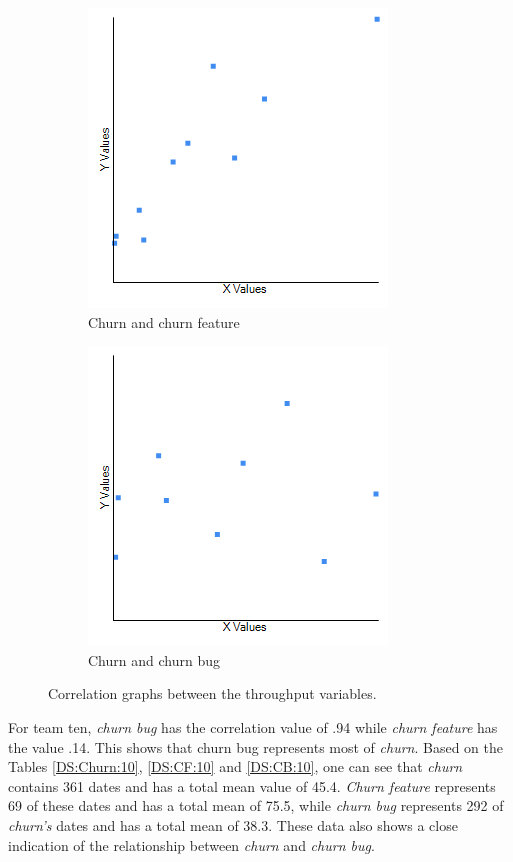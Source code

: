 \documentclass[UKenglish]{ifimaster}  %
\begin{document}
\begin{figure}[h] 
  \begin{subfigure}[b]{0.5\textwidth}
\includegraphics[scale=0.5]{Picture/Seven/ChrnvsChrnFT.png}
 \caption{Churn and churn feature} 
 \label{fig:a:7}
  \end{subfigure}
  \begin{subfigure}[b]{0.5\textwidth}
\includegraphics[scale=0.5]{Picture/Seven/ChrnvsChrnB.png}
 \caption{Churn and churn bug} 
\label{fig:b:7}
  \end{subfigure}
\caption{Correlation graphs between the throughput variables.}
\label{corr:Difference:7}
\end{figure}


For team ten, \textit{churn bug} has the correlation value of .94 while \textit{churn feature} has the value .14. This shows that churn bug represents most of \textit{churn}.  Based on the Tables \ref{DS:Churn:10}, \ref{DS:CF:10} and \ref{DS:CB:10}, one can see that \textit{churn} contains 361 dates and has a total mean value of 45.4. \textit{Churn feature} represents 69 of these dates and has a total mean of 75.5, while \textit{churn bug} represents 292 of \textit{churn's} dates and has a total mean of 38.3. These data also shows a close indication of the relationship between \textit{churn} and \textit{churn bug}.  
\end{document}

